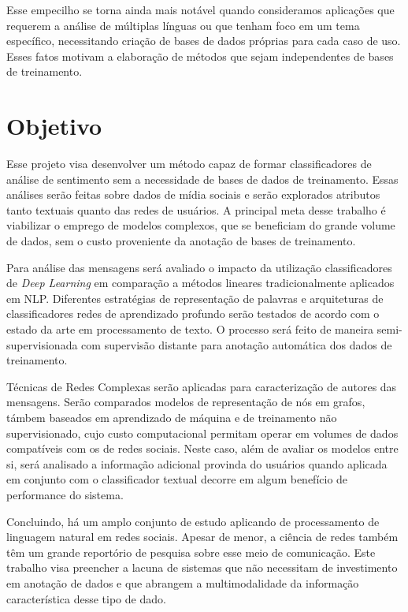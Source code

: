 Esse empecilho se torna ainda mais notável quando consideramos aplicações que
requerem a análise de múltiplas línguas ou que tenham foco em um tema
específico, necessitando criação de bases de dados próprias para cada caso de
uso.
Esses fatos motivam a elaboração de métodos que sejam independentes de bases de
treinamento.

\section{Objetivo}

Esse projeto visa desenvolver um método capaz de formar classificadores de
análise de sentimento sem a necessidade de bases de dados de treinamento.
Essas análises serão feitas sobre dados de mídia sociais e serão explorados
atributos tanto textuais quanto das redes de usuários.
A principal meta desse trabalho é viabilizar o emprego de modelos complexos,
que se beneficiam do grande volume de dados, sem o custo proveniente da anotação
de bases de treinamento.

Para análise das mensagens será avaliado o impacto da utilização classificadores
de \textit{Deep Learning} em comparação a métodos lineares tradicionalmente
aplicados em NLP.
Diferentes estratégias de representação de palavras e arquiteturas de
classificadores redes de aprendizado profundo serão testados de acordo com o
estado da arte em processamento de texto.
O processo será feito de maneira semi-supervisionada com supervisão distante
para anotação automática dos dados de treinamento.

Técnicas de Redes Complexas serão aplicadas para caracterização de autores das
mensagens.
Serão comparados modelos de representação de nós em grafos, támbem baseados em
aprendizado de máquina e de treinamento não supervisionado, cujo custo
computacional permitam operar em volumes de dados compatíveis com os de redes
sociais.
Neste caso, além de avaliar os modelos entre si, será analisado a informação
adicional provinda do usuários quando aplicada em conjunto com o classificador
textual decorre em algum benefício de performance do sistema.

Concluindo, há um amplo conjunto de estudo aplicando de processamento de
linguagem natural em redes sociais.
Apesar de menor, a ciência de redes também têm um grande reportório de pesquisa
sobre esse meio de comunicação.
Este trabalho visa preencher a lacuna de sistemas que não necessitam de
investimento em anotação de dados e que abrangem a multimodalidade da
informação característica desse tipo de dado.

